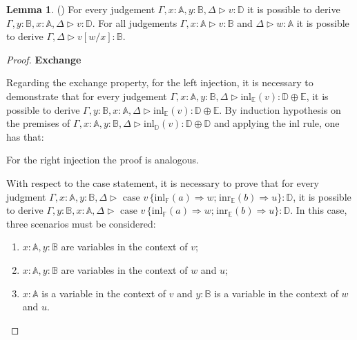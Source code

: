 \documentclass[10pt,a4paper]{amsart}
\theoremstyle{definition}
\theoremstyle{definition}
\theoremstyle{definition}
\newtheorem{lemma}[definition]{Lemma}
\theoremstyle{definition}
\theoremstyle{definition}
\theoremstyle{definition}
\begin{document}
  \begin{lemma} \label {exh_and_sub} () For every judgement $\Gamma,x:\mathbb{A}, y:\mathbb{B}, \Delta \triangleright v: \mathbb{D}$ it is possible to derive $\Gamma, y:\mathbb{B}, x:\mathbb{A}, \Delta \triangleright v: \mathbb{D}$. For all judgements  $\Gamma,x:\mathbb{A} \triangleright v: \mathbb{B}$ and $\Delta \triangleright w: \mathbb{A}$ it is possible to derive $ \Gamma, \Delta \triangleright v[w/x]: \mathbb{B}$.
  \end{lemma}


  \begin{proof}

    \textbf{Exchange}

    Regarding the exchange property, for the left injection, it is necessary to demonstrate that for every judgement $\Gamma , x:\mathbb{A}, y:\mathbb{B},\Delta\triangleright \text{inl}_{\mathbb{E}}(v):  \mathbb{D} \oplus \mathbb{E}$, it is possible to derive $\Gamma ,y:\mathbb{B}, x:\mathbb{A}, \Delta \triangleright \text{inl}_{\mathbb{E}}(v):  \mathbb{D} \oplus \mathbb{E}$. By induction hypothesis on the premises of $\Gamma , x:\mathbb{A}, y:\mathbb{B},\Delta\triangleright \text{inl}_{\mathbb{D}}(v):  \mathbb{D} \oplus \mathbb{D}$ and applying the inl rule, one has that:

    \begin{figure}[H]
      \centering
      \begin{prooftree}
      \end{prooftree}
      \end{figure}

  For the right injection the proof is analogous.

With respect to the case statement, it is necessary to prove that for every judgment $\Gamma, x:\mathbb{A}, y:\mathbb{B}, \Delta \triangleright \text{ case } v \hspace{2pt} \{\text{inl}_{\mathbb{F}}  (a) \Rightarrow w ; \hspace{1pt} \text{inr}_{\mathbb{E}}  (b) \Rightarrow u\}: \mathbb{D}$, it is possible to derive $\Gamma, y:\mathbb{B}, x:\mathbb{A}, \Delta \triangleright \text{ case } v \hspace{2pt} \{\text{inl}_{\mathbb{F}} (a) \Rightarrow w ; \hspace{1pt} \text{inr}_{\mathbb{E}} (b) \Rightarrow u\}: \mathbb{D}$. In this case, three scenarios must be considered:
\begin{enumerate}
  \item $x:\mathbb{A}, y:\mathbb{B}$ are variables in the context of $v$;
  \item $x:\mathbb{A}, y:\mathbb{B}$ are variables in the context of $w$ and $u$;
  \item  $x:\mathbb{A}$ is a variable in the context of $v$ and $y:\mathbb{B}$ is a variable in the context of $w$ and $u$.
\end{enumerate}


\end{proof}
\end{document}
